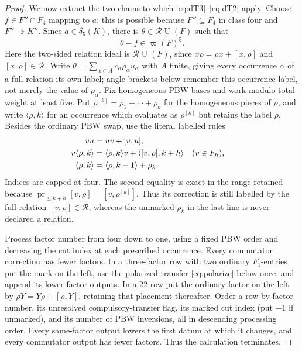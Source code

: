 \documentclass[10pt,a4paper]{amsart}
\theoremstyle{remark}
\newcommand{\U}{\operatorname U}
\newcommand{\aug}{\varpi}
\begin{document}
\begin{proof}
We now extract the two chains to which
\eqref{eq:dT3}--\eqref{eq:dT2} apply.  Choose
$f\in F''\cap F_4$ mapping to $a$; this is possible because
$F''\subseteq F_4$ in class four and $F''\twoheadrightarrow K''$.
Since $a\in\delta_5(K)$, there is
$\theta\in\mathcal R\U(F)$ such that
\begin{equation}
                         \theta-f\in\aug(F)^5.          \label{eq:witness}
\end{equation}
Here the two-sided relation ideal is $\mathcal R\U(F)$, since
$x\rho=\rho x+[x,\rho]$ and $[x,\rho]\in\mathcal R$.
Write
$\theta=\sum_{\alpha\in A}c_\alpha\rho_\alpha u_\alpha$ with $A$
finite, giving every occurrence $\alpha$ of a full relation its own
label; angle brackets below remember this occurrence label, not merely
the value of $\rho_\alpha$.  Fix homogeneous PBW
bases and work modulo total weight at least five.  Put
$\rho^{[k]}=\rho_1+\cdots+\rho_k$ for the homogeneous pieces of
$\rho$, and write $\langle\rho,k\rangle$ for an occurrence which
evaluates as $\rho^{[k]}$ but retains the label $\rho$.  Besides the
ordinary PBW swap, use the literal labelled rules
\begin{align}
 vu&=uv+[v,u],\notag\\
 v\langle\rho,k\rangle
   &=\langle\rho,k\rangle v+
     \langle[v,\rho],k+h\rangle &&(v\in F_h),\notag\\
 \langle\rho,k\rangle
   &=\langle\rho,k-1\rangle+\rho_k .                  \label{eq:collect}
\end{align}
Indices are capped at four.  The second equality is exact in the
range retained because
$\operatorname {pr}_{\leq k+h}[v,\rho]=[v,\rho^{[k]}]$.
Thus its correction is still labelled by the full relation
$[v,\rho]\in\mathcal R$, whereas the unmarked $\rho_k$ in the last
line is never declared a relation.

Process factor number from four down to one, using a fixed PBW order
and decreasing the cut index at each prescribed occurrence.  Every
commutator correction has fewer factors.  In a three-factor row with two ordinary
$F_1$-entries put the mark on the left, use the polarized transfer
\eqref{eq:polarize} below once, and append its lower-factor outputs.
In a $22$ row put the
ordinary factor on the left by $\rho Y=Y\rho+[\rho,Y]$, retaining that
placement thereafter.  Order a row by factor number, its unresolved
compulsory-transfer flag, its marked cut index (put $-1$ if unmarked),
and its number of PBW inversions, all in descending processing order.
Every same-factor output lowers the first datum at which it changes,
and every commutator output has fewer factors.  Thus the calculation
terminates.


\end{proof}
\end{document}
